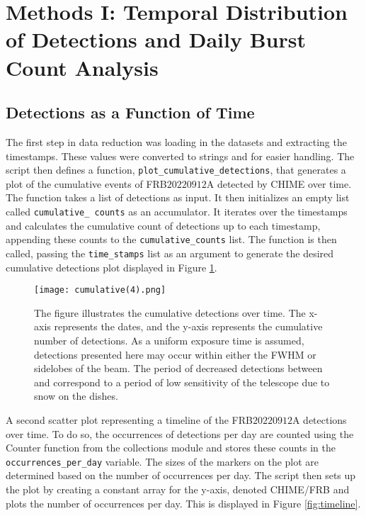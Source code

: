 \documentclass[twocolumn]{aastex631}
\begin{document}
\section{Methods I: Temporal Distribution of Detections and Daily Burst Count Analysis}
\label{sec:Methods I}
\subsection{Detections as a Function of Time}
\label{subsec:stellar}
\indent The first step in data reduction was loading in the datasets and extracting the timestamps. These values were converted to strings and for easier handling. The script then defines a function, \texttt{plot{\_}cumulative{\_}detections}, that generates a plot of the cumulative events of FRB$20220912$A detected by CHIME over time. The function takes a list of detections as input. It then initializes an empty list called \texttt{cumulative{\_} counts} as an accumulator. It iterates over the timestamps and calculates the cumulative count of detections up to each timestamp, appending these counts to the \texttt{cumulative{\_}counts} list. The function is then called, passing the \texttt{time{\_}stamps} list as an argument to generate the desired cumulative detections plot displayed in Figure \ref{fig:cumulative}. \\


\begin{figure}
    \centering
    \texttt{[image: cumulative(4).png]}
    \caption{The figure illustrates the cumulative detections over time. The x-axis represents the dates, and the y-axis represents the cumulative number of detections. As a uniform exposure time is assumed, detections presented here may occur within either the FWHM or sidelobes of the beam. The period of decreased detections between  and  correspond to a period of low sensitivity of the telescope due to snow on the dishes.}
    \label{fig:cumulative}
\end{figure}

\indent A second scatter plot representing a timeline of the FRB$20220912$A detections over time. To do so, the occurrences of detections per day are counted using the Counter function from the collections module and stores these counts in the \texttt{occurrences{\_}per{\_}day} variable. The sizes of the markers on the plot are determined based on the number of occurrences per day. The script then sets up the plot by creating a constant array for the y-axis, denoted CHIME/FRB and plots the number of occurrences per day. This is displayed in Figure \ref{fig:timeline}.\\
\end{document}
